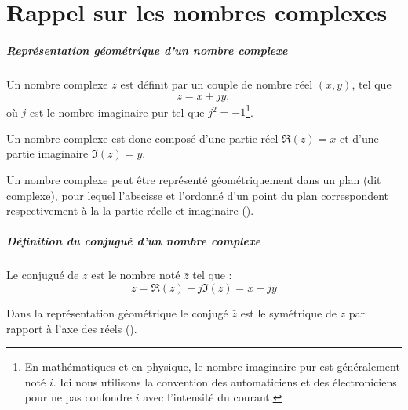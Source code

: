 \chapter{Rappel sur les nombres complexes\label{annexe-NC}}
\paragraph[Représentation d'un nombre complexe]{Représentation géométrique d'un nombre complexe}

Un nombre complexe $z$ est définit par un couple 
de nombre réel $(x,y)$, tel que 
$$
z=x+jy,
$$
où $j$ est le nombre imaginaire pur tel que $j^2=-1$\footnote{En mathématiques et en physique, le nombre 
imaginaire pur est généralement noté $i$. Ici nous utilisons la convention des automaticiens et des électroniciens pour ne
pas confondre $i$ avec l'intensité du courant.}.

Un nombre complexe est donc composé d'une partie 
réel $\Re(z)=x$ et d'une partie imaginaire $\Im(z)=y$.

Un nombre complexe peut être représenté géométriquement dans un plan 
(dit complexe), pour lequel l'abscisse et l'ordonné d'un 
point du plan correspondent respectivement 
à la la partie réelle et imaginaire ().
\paragraph{Définition du conjugué d'un nombre complexe}
Le conjugué de $z$ est le nombre noté $\bar{z}$ tel que :
$$
\bar{z}=\Re(z)-j\Im(z)=x-jy
$$

Dans la représentation géométrique le conjugé $\bar{z}$ est le symétrique de $z$ 
par rapport à l'axe des réels ().


